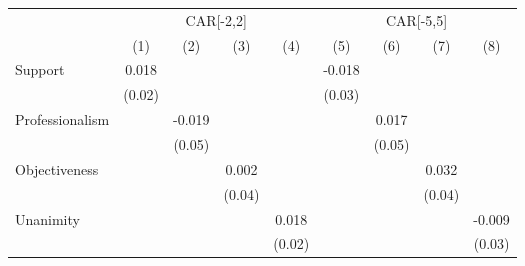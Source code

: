 {
\def\sym#1{\ifmmode^{#1}\else\(^{#1}\)\fi}
\begin{tabular}{l*{8}{c}}
\toprule
                    &\multicolumn{4}{c}{CAR[-2,2]}                                                          &\multicolumn{4}{c}{CAR[-5,5]}                                                          \\\cmidrule(lr){2-5}\cmidrule(lr){6-9}
                    &\multicolumn{1}{c}{(1)}         &\multicolumn{1}{c}{(2)}         &\multicolumn{1}{c}{(3)}         &\multicolumn{1}{c}{(4)}         &\multicolumn{1}{c}{(5)}         &\multicolumn{1}{c}{(6)}         &\multicolumn{1}{c}{(7)}         &\multicolumn{1}{c}{(8)}         \\
\midrule
Support             &       0.018         &                     &                     &                     &      -0.018         &                     &                     &                     \\
                    &      (0.02)         &                     &                     &                     &      (0.03)         &                     &                     &                     \\
Professionalism     &                     &      -0.019         &                     &                     &                     &       0.017         &                     &                     \\
                    &                     &      (0.05)         &                     &                     &                     &      (0.05)         &                     &                     \\
Objectiveness       &                     &                     &       0.002         &                     &                     &                     &       0.032         &                     \\
                    &                     &                     &      (0.04)         &                     &                     &                     &      (0.04)         &                     \\
Unanimity           &                     &                     &                     &       0.018         &                     &                     &                     &      -0.009         \\
                    &                     &                     &                     &      (0.02)         &                     &                     &                     &      (0.03)         \\

\end{tabular}}
